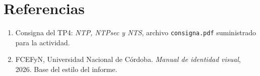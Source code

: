 \documentclass[12pt,a4paper]{article}
\begin{document}
\section{Referencias}
\begin{enumerate}
    \item Consigna del TP4: \textit{NTP, NTPsec y NTS}, archivo
    \texttt{consigna.pdf} suministrado para la actividad.
    \item FCEFyN, Universidad Nacional de Córdoba. \textit{Manual de
    identidad visual}, 2026. Base del estilo del informe.
\end{enumerate}
\end{document}
